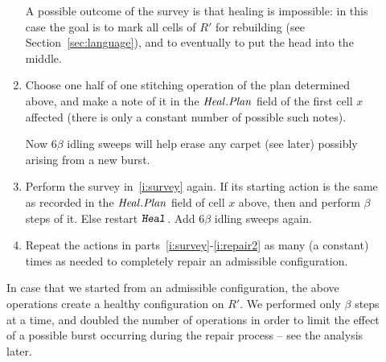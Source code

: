 \documentclass[12pt]{memoir}
\newcommand{\fld}[1]{\ensuremath{\textit{#1\/}}}
\newcommand{\rul}[1]{\ensuremath{\texttt{\slshape #1\/}}}
\newcommand{\R}{R}
\newcommand{\Heal}{\fld{Heal}}
\newcommand{\rHeal}{\rul{Heal}}
\newcommand{\Plan}{\fld{Plan}}
\newcommand{\Stage}{\fld{Stage}}
\newcommand{\Sweep}{\fld{Sw}}
\newcommand{\Committing}{\mathrm{Committing}}
\newcommand{\Planning}{\mathrm{Planing}}
\begin{document}
\begin{description}
\begin{enumerate}[label=R\arabic*, ref=R\arabic*]

A possible outcome of the survey is that healing is impossible: in this case the goal
is to mark all cells of \( \R' \) for rebuilding (see Section~\ref{sec:language}), and to
eventually to put the head into the middle.

\item\label{i:repair1} Choose one half of one stitching operation of the plan 
determined above, and make a note of it in the \( \Heal.\Plan \) field of the first
cell \( x \) affected (there is only a constant number of possible such notes).

Now \( 6\beta \) idling sweeps will help erase any carpet (see later) possibly arising from
a new burst.

\item\label{i:repair2} Perform the survey in~\ref{i:survey} again.
If its starting action is the same as recorded in the \( \Heal.\Plan \) field of cell \( x \) above,
then and perform \( \beta \) steps of it.
Else restart \( \rHeal \).
Add \( 6\beta \) idling sweeps again.

\item\label{i:repair-repeat} Repeat the actions in parts~\ref{i:survey}-\ref{i:repair2}
as many (a constant) times as needed to completely repair an admissible 
configuration.

\end{enumerate}

In case that we started from an admissible configuration, the above operations
create a healthy configuration on \( \R' \).
We performed only \( \beta \) steps at a time, and
doubled the number of operations in order to limit the effect
of a possible burst occurring during the repair process -- see the analysis later.




\end{description}
\end{document}
